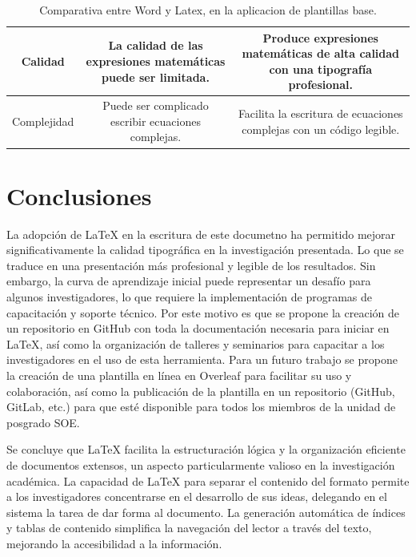 \documentclass[10pt]{article}
\begin{document}
\begin{table}[h!]
{\begin{tabular}{|c|c|c|}
            {Calidad}         & La calidad de las expresiones matemáticas puede ser limitada.         & Produce expresiones matemáticas de alta calidad con una tipografía profesional.\\ \hline
            {Complejidad}     & Puede ser complicado escribir ecuaciones complejas.          & Facilita la escritura de ecuaciones complejas con un código legible.              \\ \hline
            \end{tabular}
        }
        \caption{Comparativa entre Word y Latex, en la aplicacion de plantillas base.}
        \label{tab:Comparativas}
    \end{table}
\vspace{0.5cm}
    
    \section{Conclusiones}
    La adopción de LaTeX en la escritura de este documetno ha permitido mejorar significativamente la calidad tipográfica en la investigación presentada. 
    Lo que se traduce en una presentación más profesional y legible de los resultados. Sin embargo, la curva de aprendizaje inicial puede representar un desafío para algunos investigadores, lo que requiere la implementación de programas de capacitación y soporte técnico.
    Por este motivo es que se propone la creación de un repositorio en GitHub con toda la documentación necesaria para iniciar en LaTeX, así como la organización de talleres y seminarios para capacitar a los investigadores en el uso de esta herramienta.
    Para un futuro trabajo se propone la creación de una plantilla en línea en Overleaf para facilitar su uso y colaboración, así como la publicación de la plantilla en un repositorio (GitHub, GitLab, etc.) para que esté disponible para todos los miembros de la unidad de posgrado SOE.

    Se concluye que LaTeX facilita la estructuración lógica y la organización eficiente de documentos extensos, un aspecto particularmente valioso en la investigación académica. 
    La capacidad de LaTeX para separar el contenido del formato permite a los investigadores concentrarse en el desarrollo de sus ideas, delegando en el sistema la tarea de dar forma al documento. 
    La generación automática de índices y tablas de contenido simplifica la navegación del lector a través del texto, mejorando la accesibilidad a la información.

%
\printbibliography
%
\end{document}
